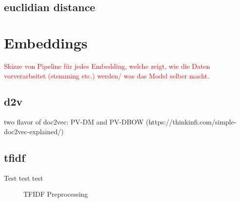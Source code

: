 \subsection{euclidian distance}\label{subsec:euclidian-distance}





\section{Embeddings}\label{sec:embeddings}

\cite{WordRep2013}
\cite{SentRep2014}

\textcolor{red}{Skizze von Pipeline für jedes Embedding, welche zeigt, wie die Daten vorverarbeitet (stemming etc.) werden/ was das Model selber macht.}


\subsection{\ac{d2v}}\label{subsec:doc2vec}
\cite{SentRep2014}
two flavor of doc2vec: PV-DM and PV-DBOW (https://thinkinfi.com/simple-doc2vec-explained/)
\cite{SkipGram2013}


\subsection{\ac{tfidf}}\label{subsec:tfidf}
Test test test
\begin{figure}[h] %
    \centering
    
    \caption{TFIDF Preprocessing}
    \label{fig:tfidf_embedding}
\end{figure}

